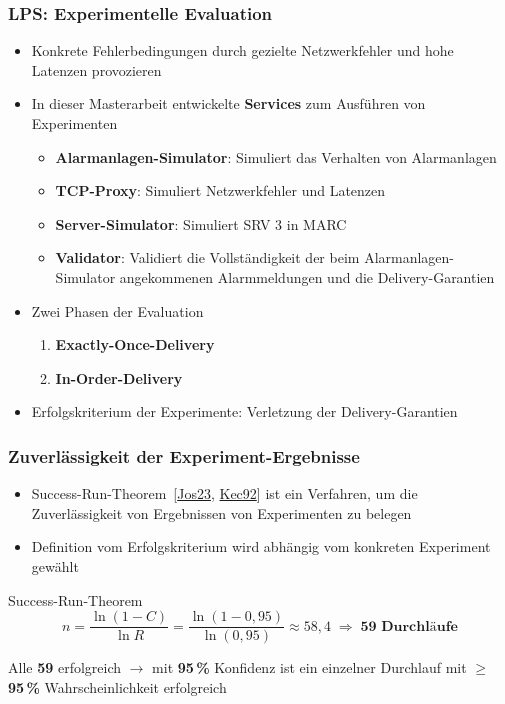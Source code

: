 \documentclass[11pt,aspectratio=1610]{beamer} %
\begin{document}
\begin{frame}
    \frametitle{LPS: Experimentelle Evaluation}

    \begin{itemize}
        \item Konkrete Fehlerbedingungen durch gezielte Netzwerkfehler und hohe Latenzen provozieren
        \item In dieser Masterarbeit entwickelte \textbf{Services} zum Ausführen von Experimenten
              \begin{itemize}
                  \item \textbf{Alarmanlagen-Simulator}: Simuliert das Verhalten von Alarmanlagen
                  \item \textbf{TCP-Proxy}: Simuliert Netzwerkfehler und Latenzen
                  \item \textbf{Server-Simulator}: Simuliert SRV 3 in MARC
                  \item \textbf{Validator}: Validiert die Vollständigkeit der beim Alarmanlagen-Simulator angekommenen Alarmmeldungen und die Delivery-Garantien
              \end{itemize}
        \item Zwei Phasen der Evaluation
              \begin{enumerate}
                  \item \textbf{Exactly-Once-Delivery}
                  \item \textbf{In-Order-Delivery}
              \end{enumerate}
        \item Erfolgskriterium der Experimente: Verletzung der Delivery-Garantien
    \end{itemize}
\end{frame}

\begin{frame}
    \frametitle{Zuverlässigkeit der Experiment-Ergebnisse}

    \begin{itemize}
        \item Success-Run-Theorem~[\hyperlink{Jos23}{Jos23}, \hyperlink{Kec92}{Kec92}] ist ein Verfahren, um die Zuverlässigkeit von Ergebnissen von Experimenten zu belegen
        \item Definition vom Erfolgskriterium wird abhängig vom konkreten Experiment gewählt
    \end{itemize}

    \begin{block}{Success-Run-Theorem}
        \[ n = \frac{\ln(1-C)}{\ln R} = \frac{\ln(1-0{,}95)}{\ln(0{,}95)} \approx 58{,}4 \;\Rightarrow\; \textbf{59 Durchläufe} \]

        Alle \textbf{59} erfolgreich $\rightarrow$ mit \textbf{95\,\%} Konfidenz ist ein einzelner Durchlauf mit $\geq$ \textbf{95\,\%} Wahrscheinlichkeit erfolgreich
    \end{block}
\end{frame}
\end{document}
